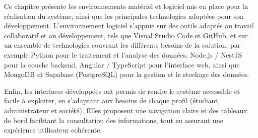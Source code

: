 Ce chapitre présente les environnements matériel et logiciel mis en place pour la réalisation du système, ainsi que les principales technologies adoptées pour son développement. L'environnement logiciel s'appuie sur des outils adaptés au travail collaboratif et au développement, tels que Visual Studio Code et GitHub, et sur un ensemble de technologies couvrant les différents besoins de la solution, par exemple Python pour le traitement et l'analyse des données, Node.js / NestJS pour la couche backend, Angular / TypeScript pour l'interface web, ainsi que MongoDB et Supabase (PostgreSQL) pour la gestion et le stockage des données.

\noindent Enfin, les interfaces développées ont permis de rendre le système accessible et facile à exploiter, en s'adaptant aux besoins de chaque profil (étudiant, administrateur et société). Elles proposent une navigation claire et des tableaux de bord facilitant la consultation des informations, tout en assurant une expérience utilisateur cohérente.
